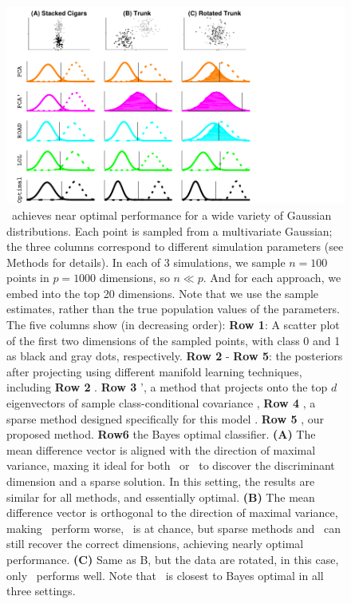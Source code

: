 \documentclass[10pt]{article}
\begin{document}
\begin{figure}[h!]%
\centering
\includegraphics[width=0.8\linewidth,trim=0in 0in 1.5in 0in,clip=true]{../Figs/cigars_est.pdf}%
\caption{
\Lol~achieves near optimal performance for a wide variety of Gaussian distributions.
Each point is sampled from a multivariate Gaussian;
the three columns correspond to different simulation parameters (see Methods for details).
In each of 3 simulations, we sample $n=100$ points in $p=1000$ dimensions, so $n \ll p$. 
And for each approach, we embed into the top 20 dimensions. Note that we use the sample estimates, rather than the true population values of the parameters.  The five columns show (in decreasing order):
\textbf{Row 1}: A scatter plot of the first two dimensions of the sampled points, with class 0 and 1 as black and gray dots, respectively.
\textbf{Row 2} - \textbf{Row 5}: the posteriors after projecting using different manifold learning techniques, including 
\textbf{Row 2} \Pca.
\textbf{Row 3} \Pca', a method that projects onto the top $d$ eigenvectors of  sample class-conditional covariance \cite{RRLDA},
\textbf{Row 4} \Road, a sparse method designed specifically for this model \cite{Fan2012a}.
\textbf{Row 5} \Lol, our  proposed method.
\textbf{Row6} the Bayes optimal classifier.
%
\textbf{(A)} The mean difference vector is aligned with the direction of maximal variance, maxing it ideal for both \Pca~or \Rrlda~to discover the discriminant dimension and a sparse solution. In this setting, the results are  similar for all methods, and essentially optimal.
\textbf{(B)} The mean difference vector is orthogonal to the direction of maximal variance, making \Pca~perform worse, \Rrlda~is at chance, but sparse methods and \Lol~can still recover the correct dimensions, achieving nearly optimal performance.
\textbf{(C)} Same as B, but the data are rotated, in this case, only \Lol~performs well.
Note that \Lol~is closest to Bayes optimal in all three settings.
}
\label{f:cigars}
\end{figure}
\end{document}
